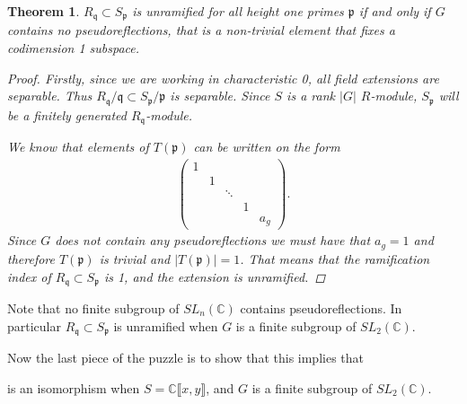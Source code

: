 \documentclass[11pt, a4paper, english]{article}
\newtheorem{theorem}{Theorem}[section]
\theoremstyle{definition}
\newcommand{\C}{\mathbb{C}}
\DeclareMathOperator{\End}{End}
\begin{document}
\begin{theorem}
\label{thm:unramified_pseudoreflections}
$R_\mathfrak{q} \subset S_\mathfrak{p}$ is unramified for all height one primes $\mathfrak{p}$ if and only if $G$ contains no pseudoreflections, that is a non-trivial element that fixes a codimension 1 subspace.
\begin{proof}
Firstly, since we are working in characteristic 0, all field extensions are separable. Thus $R_\mathfrak{q}/\mathfrak{q} \subset S_\mathfrak{p}/\mathfrak{p}$ is separable. Since $S$ is a rank $|G|$ $R$-module, $S_\mathfrak{p}$ will be a finitely generated $R_\mathfrak{q}$-module.

We know that elements of $T(\mathfrak{p})$ can be written on the form
\begin{align*}
\begin{pmatrix}
1\\
& 1\\
&& \ddots\\
&&&1\\
&&&& a_g
\end{pmatrix}.
\end{align*}
Since $G$ does not contain any pseudoreflections we must have that $a_g = 1$ and therefore $T(\mathfrak{p})$ is trivial and $|T(\mathfrak{p})| = 1$. That means that the ramification index of $R_\mathfrak{q} \subset S_\mathfrak{p}$ is 1, and the extension is unramified.
\end{proof}
\end{theorem}
Note that no finite subgroup of $SL_n(\C)$ contains pseudoreflections. In particular $R_\mathfrak{q} \subset S_\mathfrak{p}$ is unramified when $G$ is a finite subgroup of $SL_2(\C)$.

Now the last piece of the puzzle is to show that this implies that
\begin{center}
\end{center}
is an isomorphism when $S = \C\llbracket x, y \rrbracket$, and $G$ is a finite subgroup of $SL_2(\C)$.
\end{document}
